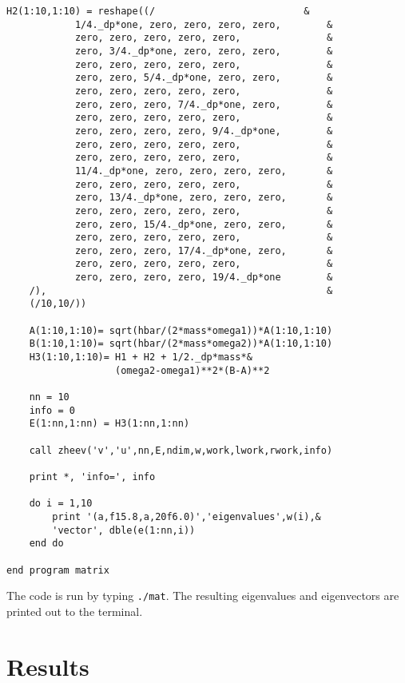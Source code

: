 \documentclass[12pt]{article}
\begin{document}
\begin{lstlisting}[frame=single,caption={ {\tt mtest.f95}},label=module]
	H2(1:10,1:10) = reshape((/							&
			1/4._dp*one, zero, zero, zero, zero,		&
			zero, zero, zero, zero, zero,				&
			zero, 3/4._dp*one, zero, zero, zero,		&
			zero, zero, zero, zero, zero,				&
			zero, zero, 5/4._dp*one, zero, zero,		&
			zero, zero, zero, zero, zero,				&
			zero, zero, zero, 7/4._dp*one, zero,		&
			zero, zero, zero, zero, zero,				&
			zero, zero, zero, zero, 9/4._dp*one,		&
			zero, zero, zero, zero, zero,				&
			zero, zero, zero, zero, zero,				&
			11/4._dp*one, zero, zero, zero, zero,		&
			zero, zero, zero, zero, zero,				&
			zero, 13/4._dp*one, zero, zero, zero,		&
			zero, zero, zero, zero, zero,				&
			zero, zero, 15/4._dp*one, zero, zero,		&
			zero, zero, zero, zero, zero,				&
			zero, zero, zero, 17/4._dp*one, zero,		&
			zero, zero, zero, zero, zero,				&
			zero, zero, zero, zero, 19/4._dp*one 		&
	/), 												&
	(/10,10/))

	A(1:10,1:10)= sqrt(hbar/(2*mass*omega1))*A(1:10,1:10)
	B(1:10,1:10)= sqrt(hbar/(2*mass*omega2))*A(1:10,1:10)
	H3(1:10,1:10)= H1 + H2 + 1/2._dp*mass*&
				   (omega2-omega1)**2*(B-A)**2

	nn = 10
	info = 0
	E(1:nn,1:nn) = H3(1:nn,1:nn)

	call zheev('v','u',nn,E,ndim,w,work,lwork,rwork,info)

	print *, 'info=', info

	do i = 1,10
		print '(a,f15.8,a,20f6.0)','eigenvalues',w(i),&
		'vector', dble(e(1:nn,i)) 
	end do

end program matrix

\end{lstlisting}



The code is run by typing {\tt ./mat}. The resulting eigenvalues and eigenvectors are printed out to the terminal.

\section{Results}
\end{document}
